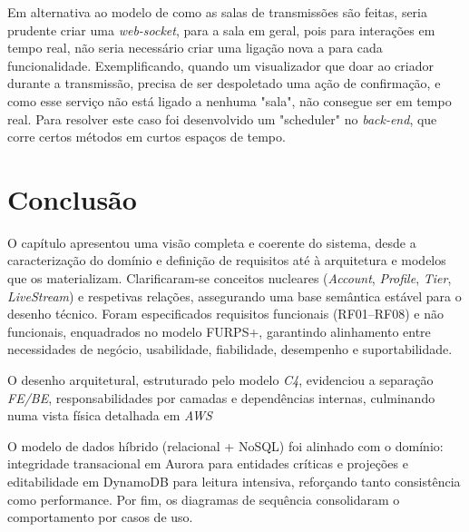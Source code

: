 Em alternativa ao modelo de como as salas de transmissões são feitas, seria prudente criar uma \textit{web-socket}, para a sala em geral, pois para interações em tempo real, não seria necessário criar uma ligação nova a para cada funcionalidade. Exemplificando, quando um visualizador que doar ao criador durante a transmissão, precisa de ser despoletado uma ação de confirmação, e como esse serviço não está ligado a nenhuma "sala", não consegue ser em tempo real. Para resolver este caso foi desenvolvido um "scheduler" no \textit{back-end}, que corre certos métodos em curtos espaços de tempo.

\section{Conclusão}

O capítulo apresentou uma visão completa e coerente do sistema, desde a caracterização do domínio e definição de requisitos até à arquitetura e modelos que os materializam. Clarificaram-se conceitos nucleares (\textit{Account}, \textit{Profile}, \textit{Tier}, \textit{LiveStream}) e respetivas relações, assegurando uma base semântica estável para o desenho técnico. Foram especificados requisitos funcionais (RF01–RF08) e não funcionais, enquadrados no modelo FURPS+, garantindo alinhamento entre necessidades de negócio, usabilidade, fiabilidade, desempenho e suportabilidade.

O desenho arquitetural, estruturado pelo modelo \textit{C4}, evidenciou a separação \textit{FE/BE}, responsabilidades por camadas e dependências internas, culminando numa vista física detalhada em \textit{AWS}

O modelo de dados híbrido (relacional + NoSQL) foi alinhado com o domínio: integridade transacional em Aurora para entidades críticas e projeções e editabilidade em DynamoDB para leitura intensiva, reforçando tanto consistência como performance. Por fim, os diagramas de sequência consolidaram o comportamento por casos de uso.







\label{sec:Des}



